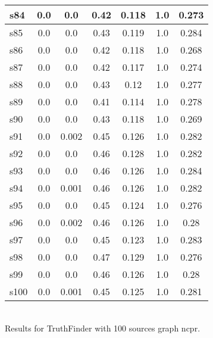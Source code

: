 \documentclass{article}
\begin{document}
\begin{tabular}{|l|c|c|c|c|c|c|}
\hline
s84 &0.0 & 0.0 & 0.42 & 0.118 & 1.0 & 0.273\\
\hline
s85 &0.0 & 0.0 & 0.43 & 0.119 & 1.0 & 0.284\\
\hline
s86 &0.0 & 0.0 & 0.42 & 0.118 & 1.0 & 0.268\\
\hline
s87 &0.0 & 0.0 & 0.42 & 0.117 & 1.0 & 0.274\\
\hline
s88 &0.0 & 0.0 & 0.43 & 0.12 & 1.0 & 0.277\\
\hline
s89 &0.0 & 0.0 & 0.41 & 0.114 & 1.0 & 0.278\\
\hline
s90 &0.0 & 0.0 & 0.43 & 0.118 & 1.0 & 0.269\\
\hline
s91 &0.0 & 0.002 & 0.45 & 0.126 & 1.0 & 0.282\\
\hline
s92 &0.0 & 0.0 & 0.46 & 0.128 & 1.0 & 0.282\\
\hline
s93 &0.0 & 0.0 & 0.46 & 0.126 & 1.0 & 0.284\\
\hline
s94 &0.0 & 0.001 & 0.46 & 0.126 & 1.0 & 0.282\\
\hline
s95 &0.0 & 0.0 & 0.45 & 0.124 & 1.0 & 0.276\\
\hline
s96 &0.0 & 0.002 & 0.46 & 0.126 & 1.0 & 0.28\\
\hline
s97 &0.0 & 0.0 & 0.45 & 0.123 & 1.0 & 0.283\\
\hline
s98 &0.0 & 0.0 & 0.47 & 0.129 & 1.0 & 0.276\\
\hline
s99 &0.0 & 0.0 & 0.46 & 0.126 & 1.0 & 0.28\\
\hline
s100 &0.0 & 0.001 & 0.45 & 0.125 & 1.0 & 0.281\\
\hline
\end{tabular}\\

\noindent Results for TruthFinder with 100 sources graph ncpr.
\end{document}
